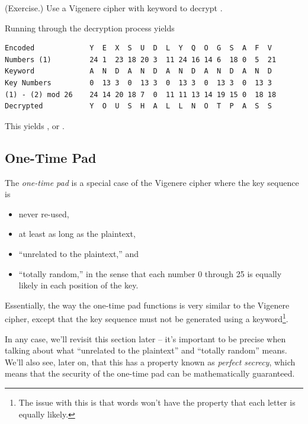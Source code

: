 \documentclass[letterpaper]{article}
\newcommand{\0}{\mathbf{0}}
\begin{document}
\begin{mdframed}
    (Exercise.) Use a Vigenere cipher with keyword  to decrypt . 

    \begin{mdframed}
        Running through the decryption process yields 
        \begin{mdframed}
\begin{verbatim}
Encoded             Y  E  X  S  U  D  L  Y  Q  O  G  S  A  F  V 
Numbers (1)         24 1  23 18 20 3  11 24 16 14 6  18 0  5  21
Keyword             A  N  D  A  N  D  A  N  D  A  N  D  A  N  D
Key Numbers         0  13 3  0  13 3  0  13 3  0  13 3  0  13 3
(1) - (2) mod 26    24 14 20 18 7  0  11 11 13 14 19 15 0  18 18
Decrypted           Y  O  U  S  H  A  L  L  N  O  T  P  A  S  S 
\end{verbatim}
        \end{mdframed}
        This yields , or .
    \end{mdframed}
\end{mdframed}

\subsection{One-Time Pad}
The \emph{one-time pad} is a special case of the Vigenere cipher where the key sequence is 
\begin{itemize}
    \item never re-used, 
    \item at least as long as the plaintext, 
    \item ``unrelated to the plaintext,'' and 
    \item ``totally random,'' in the sense that each number 0 through 25 is equally likely in each position of the key.
\end{itemize}
Essentially, the way the one-time pad functions is very similar to the Vigenere cipher, except that the key sequence must not be generated using a keyword\footnote{The issue with this is that words won't have the property that each letter is equally likely.}. 

\bigskip 

In any case, we'll revisit this section later -- it's important to be precise when talking about what ``unrelated to the plaintext'' and ``totally random'' means. We'll also see, later on, that this has a property known as \emph{perfect secrecy}, which means that the security of the one-time pad can be mathematically guaranteed. 
\end{document}

